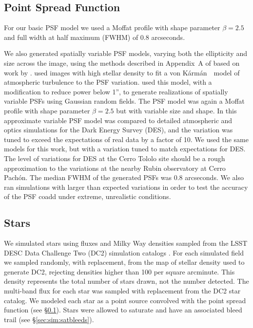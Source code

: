 \documentclass[twocolumn,twocolappendix,astrosym]{openjournal}
\newcommand{\vonkarman}{{von K\'arm\'an}~}
\begin{document}
\subsection{Point Spread Function} \label{sec:sim:psfs}

For our basic PSF model we used a Moffat profile \citep{Moffat1969} with shape
parameter $\beta=2.5$ and full width at half maximum (FWHM) of 0.8 arcseconds.

We also generated spatially variable PSF models, varying both the ellipticity
and size across the image, using the methods described in Appendix~A of
\citet{mdet20} based on work by \citet{heymans2012}.  \citet{heymans2012} used
images with high stellar density to fit a \vonkarman\ model of atmospheric
turbulence to the PSF variation. \citet{mdet20} used this model, with a
modification to reduce power below 1'', to generate realizations of spatially
variable PSFs using Gaussian random fields. The PSF model was again a Moffat
profile with shape parameter $\beta=2.5$ but with variable size and shape. In
\citet{mdet20} this approximate variable PSF model was compared to detailed
atmospheric and optics simulations for the Dark Energy Survey (DES), and the
variation was tuned to exceed the expectations of real data by a factor of 10.
We used the same models for this work, but with a variation tuned to match
expectations for DES.  The level of variations for DES at the Cerro Tololo
site should be a rough approximation to the variations at the nearby Rubin
observatory at Cerro Pachón.  The median FWHM of the generated PSFs was 0.8
arcseconds.  We also ran simulations with larger than expected variations in
order to test the accuracy of the PSF coadd under extreme, unrealistic
conditions.

\subsection{Stars} \label{sec:sim:stars}

We simulated stars using fluxes and Milky Way densities sampled from the LSST
DESC Data Challenge Two (DC2) simulation catalogs \citep{DC2Abolfathi2021}.
For each simulated field we sampled randomly, with replacement, from the map of
stellar density used to generate DC2, rejecting densities higher than 100 per
square arcminute.  This density represents the total number of stars drawn, not
the number detected.  The multi-band flux for each star was sampled with
replacement from the DC2 star catalog.  We modeled each star as a point
source convolved with the point spread function
(see \S \ref{sec:sim:psfs}).  Stars were allowed to saturate and have an
associated bleed trail (see \S \ref{sec:sim:satbleeds}).
\end{document}
